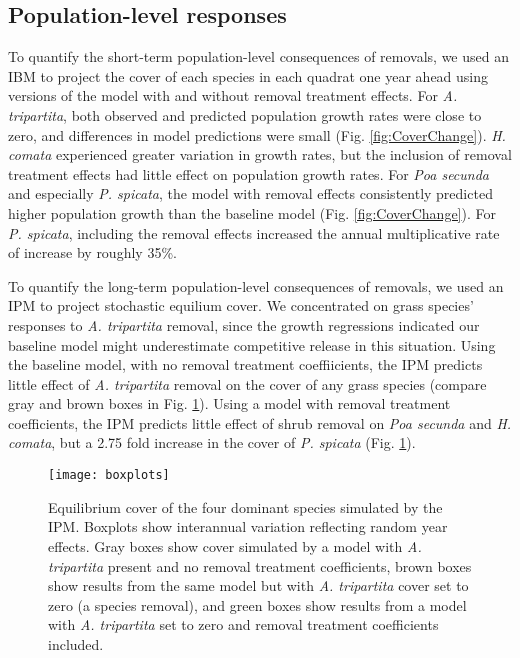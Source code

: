 \documentclass[11pt]{article}
\begin{document}
\begin{doublespacing}
\subsection*{Population-level responses}

To quantify the short-term population-level consequences of removals, we used an IBM to project the cover of each species in each quadrat one year ahead using versions of the model with and without removal treatment effects. For \textit{A. tripartita}, both observed and predicted population growth rates were close to zero, and differences in model predictions were small (Fig. \ref{fig:CoverChange}). \textit{H. comata} experienced greater variation in growth rates, but the inclusion of removal treatment effects had little effect on population growth rates. For \textit{Poa secunda} and especially \textit{P. spicata}, the model with removal effects consistently predicted higher population growth than the baseline model  (Fig. \ref{fig:CoverChange}). For \textit{P. spicata}, including the removal effects increased the annual multiplicative rate of increase by roughly 35\%.

To quantify the long-term population-level consequences of removals, we used an IPM to project stochastic equilium cover. We concentrated on grass species' responses to \textit{A. tripartita} removal, since the growth regressions indicated our baseline model might underestimate competitive release in this situation. Using the baseline model, with no removal treatment coeffiicients, the IPM predicts little effect of \textit{A. tripartita} removal on the cover of any grass species (compare gray and brown boxes in Fig. \ref{fig:IPMresults}). Using a model with removal treatment coefficients, the IPM predicts little effect of shrub removal on \textit{Poa secunda} and \textit{H. comata}, but a 2.75 fold increase in the cover of \textit{P. spicata} (Fig. \ref{fig:IPMresults}).

 \begin{figure}[tbp]
 \centering
 \texttt{[image: boxplots]}
 \caption{Equilibrium cover of the four dominant species simulated by the IPM. Boxplots show interannual variation reflecting random year effects. Gray boxes show cover simulated by a model with \textit{A. tripartita} present and no removal treatment coefficients, brown boxes show results from the same model but with \textit{A. tripartita} cover set to zero (a species removal), and green boxes show results from a model with  \textit{A. tripartita} set to zero and removal treatment coefficients included.  }
 \label{fig:IPMresults}
 \end{figure}


\end{doublespacing}
\end{document}
